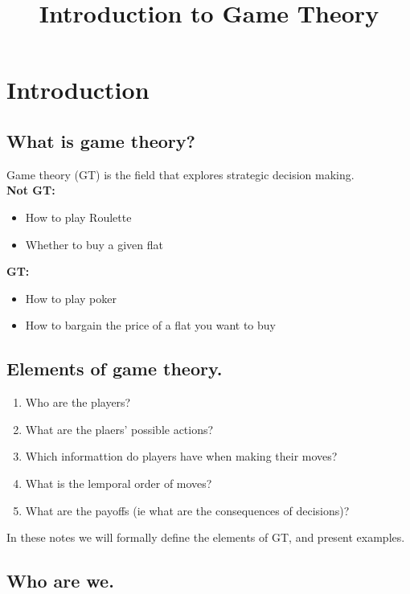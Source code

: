 \documentclass{article}
\title{Introduction to Game Theory}
\date{}
\begin{document}
\maketitle

\section{Introduction}

\subsection{What is game theory?}
Game theory (GT) is the field that explores strategic decision making. \\

\textbf{Not GT:}
\begin{itemize}
    \item How to play Roulette
    \item Whether to buy a given flat
\end{itemize}

\textbf{GT:}
\begin{itemize}
    \item How to play poker
    \item How to bargain the price of a flat you want to buy
\end{itemize}

\subsection{Elements of game theory.}

\begin{enumerate}
    \item Who are the players?
    \item What are the plaers' possible actions?
    \item Which informattion do players have when making their moves?
    \item What is the lemporal order of moves?
    \item What are the payoffs (ie what are the consequences of decisions)?
\end{enumerate}

In these notes we will formally define the elements of GT, and present examples.

\subsection{Who are we.}
\end{document}
